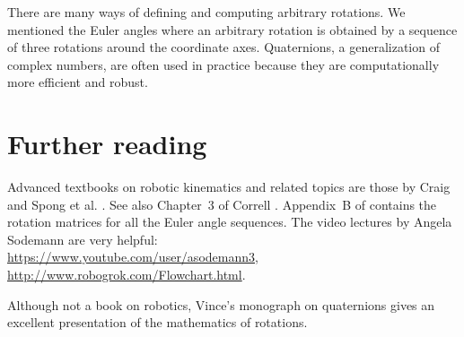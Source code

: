 There are many ways of defining and computing arbitrary rotations. We mentioned the Euler angles where an arbitrary rotation is obtained by a sequence of three rotations around the coordinate axes. Quaternions, a generalization of complex numbers, are often used in practice because they are computationally more efficient and robust.

\section{Further reading}

Advanced textbooks on robotic kinematics and related topics are those by Craig \cite{craig} and Spong et al. \cite{spong}. See also Chapter~3 of Correll \cite{correll}. Appendix~B of \cite{craig} contains the rotation matrices for all the Euler angle sequences. The video lectures by Angela Sodemann are very helpful:\\
\url{https://www.youtube.com/user/asodemann3},\\
\url{http://www.robogrok.com/Flowchart.html}.

Although not a book on robotics, Vince's monograph on quaternions \cite{vince} gives an excellent presentation of the mathematics of rotations.
